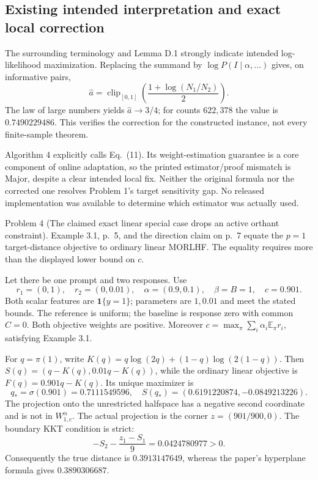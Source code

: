 \documentclass[10pt]{article}
\begin{document}
\subsection*{Existing intended interpretation and exact local correction}
The surrounding terminology and Lemma D.1 strongly indicate intended log-likelihood maximization. Replacing the summand by \(\log P(I\mid\alpha,\ldots)\) gives, on informative pairs, \[\widehat a=
 \operatorname{clip}_{[0,1]}
 \left(\frac{1+\log(N_1/N_2)}2\right).\] The law of large numbers yields \(\widehat a\to3/4\); for counts \(622,378\) the value is \(0.7490229486\). This verifies the correction for the constructed instance, not every finite-sample theorem.\par
Algorithm 4 explicitly calls Eq. (11). Its weight-estimation guarantee is a core component of online adaptation, so the printed estimator/proof mismatch is Major, despite a clear intended local fix. Neither the original formula nor the corrected one resolves Problem 1’s target sensitivity gap. No released implementation was available to determine which estimator was actually used.\par
Problem 4 (The claimed exact linear special case drops an active orthant constraint).  Example 3.1, p. 5, and the direction claim on p. 7 equate the \(p=1\) target-distance objective to ordinary linear MORLHF. The equality requires more than the displayed lower bound on \(c\).\par
Let there be one prompt and two responses. Use \[r_1=(0,1),\quad r_2=(0,0.01),\quad
 \alpha=(0.9,0.1),\quad \beta=B=1,\quad c=0.901.\] Both scalar features are \(\mathbf1\{y=1\}\); parameters are \(1,0.01\) and meet the stated bounds. The reference is uniform; the baseline is response zero with common \(C=0\). Both objective weights are positive. Moreover \(c=\max_\pi\sum_i\alpha_i\mathbb E_\pi r_i\), satisfying Example 3.1.\par
For \(q=\pi(1)\), write \(K(q)=q\log(2q)+(1-q)\log(2(1-q))\). Then \(S(q)=(q-K(q),0.01q-K(q))\), while the ordinary linear objective is \(F(q)=0.901q-K(q)\). Its unique maximizer is \[q_*=\sigma(0.901)=0.7111549596,\quad
 S(q_*)=(0.6191220874,-0.0849213226).\] The projection onto the unrestricted halfspace has a negative second coordinate and is not in \(W^\alpha_{1,c}\). The actual projection is the corner \(z=(901/900,0)\). The boundary KKT condition is strict: \[-S_2-\frac{z_1-S_1}{9}=0.0424780977>0.\] Consequently the true distance is \(0.3913147649\), whereas the paper’s hyperplane formula gives \(0.3890306687\).\par
\end{document}
